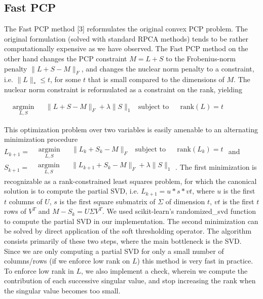 \documentclass[oneside]{article}
\begin{document}
\subsection{Fast PCP}
The Fast PCP method [3] reformulates the original convex PCP problem. The original formulation (solved with standard RPCA methods) tends to be rather computationally expensive as we have observed. The Fast PCP method on the other hand changes the PCP constraint $M = L+S$ to the Frobenius-norm penalty $\lVert L+S-M\rVert_{F}$, and changes the nuclear norm penalty to a constraint, i.e. $\lVert L\rVert_{*} \le t$, for some $t$ that is small compared to the dimensions of $M$. The nuclear norm constraint is reformulated as a constraint on the rank, yielding
\begin{center}
$
\begin{aligned}
& \underset{L,S}{\text{argmin}}
& & \lVert L+S-M\rVert_{F}+ \lambda\lVert S\rVert_{1} 
& \text{subject to}
& & \text{rank}(L) = t
\end{aligned}
$
\end{center}
This optimization problem over two variables is easily amenable to an alternating minimization procedure $
L_{k+1}  =\begin{aligned}
& \underset{L,S}{\text{argmin}}
& & \lVert L_{k}+S_{k}-M\rVert_{F}
& \text{subject to}
& & \text{rank}(L_{k}) = t
\end{aligned}
$ and $S_{k+1} = \begin{aligned}
& \underset{L,S}{\text{argmin}}
& & \lVert L_{k+1}+S_{k}-M\rVert_{F}+ \lambda\lVert S\rVert_{1} 
\end{aligned}
$. The first minimization is recognizable as a rank-constrained least squares problem, for which the canonical solution is to compute the partial SVD, i.e. $L_{k+1} = u*s*vt$, where $u$ is the first $t$ columns of $U$, $s$ is the first square submatrix of $\Sigma$ of dimension $t$, $vt$ is the first $t$ rows of $V^{T}$ and  $M-S_{k} = U\Sigma V^{T}$. We used scikit-learn's randomized\_svd function to compute the partial SVD in our implementation. The second minimization can be solved by direct application of the soft thresholding operator. The algorithm consists primarily of these two steps, where the main bottleneck is the SVD. Since we are only computing a partial SVD for only a small number of columns/rows (if we enforce low rank on $L$) this method is very fast in practice. To enforce low rank in $L$, we also implement a check, wherein we compute the contribution of each successive singular value, and stop increasing the rank when the singular value becomes too small.\newline\newline
\end{document}
